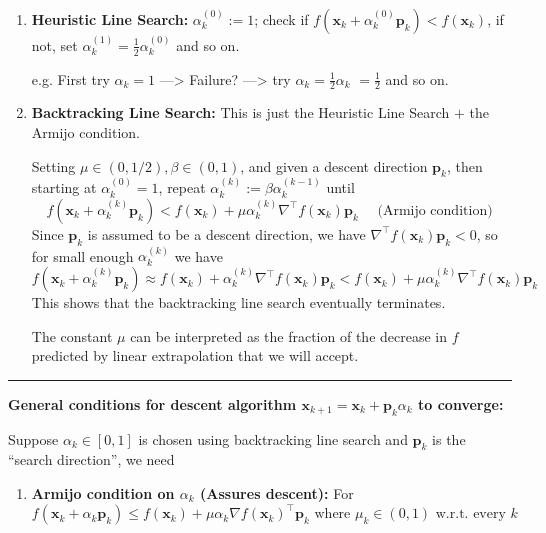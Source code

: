 \documentclass[11pt]{article}
\theoremstyle{plain} %
\newenvironment{topic}
{\color{C2}\normalfont\begin{framed}\begingroup }
  {\endgroup\end{framed}}
\theoremstyle{remark}
\begin{document}
\begin{topic}
\begin{enumerate}
    \item \textbf{Heuristic Line Search:} $\alpha_k^{(0)}:=1$; check if $f\left(\mathbf{x}_k+\alpha_k^{(0)} \mathbf{p}_k\right)<f\left(\mathbf{x}_k\right)$, if not, set $\alpha_k^{(1)}=\frac{1}{2} \alpha_k^{(0)}$ and so on.

          e.g. First try $\alpha_k=1$ ---> Failure? ---> try $\alpha_k=\frac{1}{2} \alpha_k$
          $=\frac{1}{2}$ and so on.
    \item \textbf{Backtracking Line Search:} This is just the Heuristic Line Search $+$ the Armijo condition.

          Setting $\mu \in(0,1 / 2), \beta \in(0,1)$, and given a descent direction $\mathbf{p}_k$, then starting at
          $\alpha_k^{(0)}=1$, repeat $\alpha_k^{(k)}:=\beta \alpha_k^{(k-1)}$ until
          \[
            f(\mathbf{x}_k+\alpha_k^{(k)} \mathbf{p}_k)<f(\mathbf{x}_k)+\mu \alpha_k^{(k)} \nabla^\top f\left(\mathbf{x}_k\right)\mathbf{p}_k
            \quad \text{ (Armijo condition) }
          \]
          Since $\mathbf{p}_k$ is assumed to be a descent direction, we have $\nabla^\top f\left(\mathbf{x}_k\right)
            \mathbf{p}_k<0$, so for small enough $\alpha_k^{(k)}$ we have
          \[
            f(\mathbf{x}_k+\alpha_k^{(k)} \mathbf{p}_k)
            \approx
            f(\mathbf{x}_k)+\alpha_k^{(k)} \nabla^\top f\left(\mathbf{x}_k\right)\mathbf{p}_k
            <
            f(\mathbf{x}_k)+\mu \alpha_k^{(k)}\nabla^\top f\left(\mathbf{x}_k\right)\mathbf{p}_k
          \]
          This shows that the backtracking line search eventually terminates.

          The constant $\mu$ can be interpreted as the fraction of the decrease in $f$
          predicted by linear extrapolation that we will accept.
  \end{enumerate}
  \vspace*{0.5em}

  \hrule

  \textbf{General conditions for descent algorithm $\mathbf{x}_{k+1}=\mathbf{x}_k+\mathbf{p}_k \alpha_k$ to converge:}

  Suppose $\alpha_k \in[0,1]$ is chosen using backtracking line search and $\mathbf{p}_k$ is the ``search direction'', we need

  \begin{enumerate}
    \item \textbf{Armijo condition on $\alpha_k$ (Assures descent):} For
          \[
            f\left(\mathbf{x}_k+\alpha_k \mathbf{p}_k\right) \leqslant f\left(\mathbf{x}_k\right)+\mu \alpha_k \nabla f\left(\mathbf{x}_k\right)^{\top} \mathbf{p}_k
            \text{ where } \mu_k\in(0,1) \text{ w.r.t. every }  k
          \]


\end{enumerate}
\end{topic}
\end{document}
